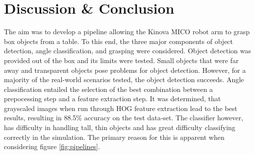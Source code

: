 \documentclass[letterpaper, 10 pt, conference]{conf/ieeeconf}  %
\begin{document}
\section{Discussion \& Conclusion}
\label{sec:discussion}
The aim was to develop a pipeline allowing the Kinova MICO robot arm to grasp
box objects from a table. To this end, the three major components of object
detection, angle classification, and grasping were considered. Object detection
was provided out of the box and its limits were tested. Small objects that were
far away and transparent objects pose problems for object detection. However,
for a majority of the real-world scenarios tested, the object detection
succeeds. Angle classification entailed the selection of the best combination
between a prepocessing step and a feature extraction step. It was determined,
that grayscaled images when run through HOG feature extraction lead to the best
results, resulting in 88.5\% accuracy on the test data-set. The classifier
however, has difficulty in handling tall, thin objects and has great difficulty
classifying correctly in the simulation. The primary reason for this is apparent
when considering figure \ref{fig:pipelines}.
\end{document}
